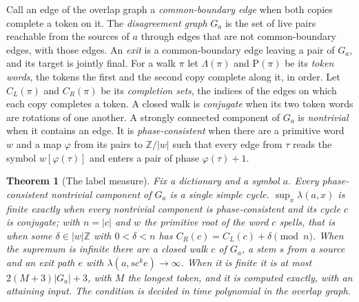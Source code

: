 \documentclass[11pt,a4paper]{article}
\theoremstyle{definition}
\theoremstyle{plain}
\newtheorem{theorem}{Theorem}
\begin{document}

Call an edge of the overlap graph a \emph{common-boundary edge} when both copies complete a token on it. The
\emph{disagreement graph} \(G_a\) is the set of live pairs reachable from the sources of \(a\) through edges that are
not common-boundary edges, with those edges. An \emph{exit} is a common-boundary edge leaving a pair of \(G_a\), and its
target is jointly final. For a walk \(\pi\) let \(\Lambda(\pi)\) and \(\mathrm{P}(\pi)\) be its \emph{token words}, the
tokens the first and the second copy complete along it, in order. Let \(C_L(\pi)\) and \(C_R(\pi)\) be its
\emph{completion sets}, the indices of the edges on which each copy completes a token. A closed walk is \emph{conjugate}
when its two token words are rotations of one another. A strongly connected component of \(G_a\) is \emph{nontrivial}
when it contains an edge. It is \emph{phase-consistent} when there are a primitive word \(w\) and a map \(\varphi\) from
its pairs to \(\mathbb{Z}/|w|\) such that every edge from \(\tau\) reads the symbol \(w[\varphi(\tau)]\) and enters a
pair of phase \(\varphi(\tau) + 1\).

\begin{theorem}[The label measure]\label{thm:labelgraph}
Fix a dictionary and a symbol \(a\). Every phase-consistent nontrivial component of \(G_a\) is a single simple cycle.
\(\sup_x \lambda(a, x)\) is finite exactly when every nontrivial component is phase-consistent and its cycle \(c\) is
conjugate; with \(n = |c|\) and \(w\) the primitive root of the word \(c\) spells, that is when some
\(\delta \in |w|\mathbb{Z}\) with \(0 < \delta < n\) has \(C_R(c) = C_L(c) + \delta \pmod n\). When the supremum is
infinite there are a closed walk \(c\) of \(G_a\), a stem \(s\) from a source and an exit path \(e\) with
\(\lambda(a, s c^k e) \to \infty\). When it is finite it is at most \(2(M + 3)|G_a| + 3\), with \(M\) the longest token,
and it is computed exactly, with an attaining input. The condition is decided in time polynomial in the overlap graph.
\end{theorem}
\end{document}
